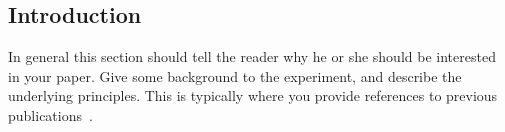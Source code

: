 \subsection{Introduction}

In general this section should tell the reader why he or she should
be interested in your paper. Give some background to the
experiment, and describe the underlying principles. This is typically where you provide references to previous publications~\cite{Sato2003,Cross2004}.